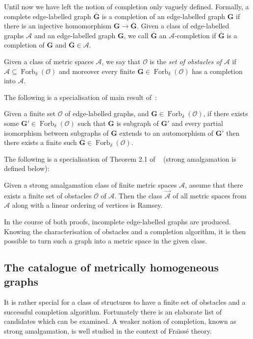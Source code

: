 \documentclass[11pt]{amsart}
\def\Forb{\mathop{\mathrm{Forb}}\nolimits}
\def\str#1{\mathbf {#1}}
\def\Fraisse{Fra\"{\i}ss\' e}
\begin{document}
Until now we have left the notion of completion only vaguely defined. Formally, a complete edge-labelled graph $\bar{\str{G}}$ is a completion of an edge-labelled graph $\str{G}$ if there is an injective homomorphism $\str{G}\to\bar {\str{G}}$. Given a class of edge-labelled graphs $\mathcal A$ and an edge-labelled graph $\str{G}$, we call $\bar {\str{G}}$ an $\mathcal A$-completion if $\bar {\str{G}}$ is a completion of $\str{G}$ and $\bar {\str{G}}\in\mathcal A$.

\begin{definition}
Given a class of metric spaces $\mathcal A$, we say that $\mathcal O$ is the {\em
set of obstacles of $\mathcal A$} if $\mathcal A\subseteq \Forb_{\delta}(\mathcal O)$ and
moreover every finite $\str{G}\in \Forb_{\delta}(\mathcal O)$ has a completion into $\mathcal A$.
\end{definition}

The following is a specialisation of main result of~\cite[Theorem~3.2]{herwig2000}:
\begin{theorem}
\label{thm:herwiglascar}
Given a finite set $\mathcal{O}$ of edge-la\-belled graphs, and $\str{G}\in \Forb_{\delta}(\mathcal O)$,
 if there exists some $\str{G}'\in \Forb_{\delta}(\mathcal O)$ such that $\str{G}$ is subgraph of $\str{G}'$ and every partial isomorphism between subgraphs of $\str{G}$
extends to an automorphism of $\str{G}'$ then there exists a finite such $\overline{\str{G}} \in \Forb_{\delta}(\mathcal O)$.
\end{theorem}
The following is a specialisation of Theorem 2.1 of ~\cite{Hubicka2016} (strong amalgamation is defined below):
\begin{theorem}
\label{thm:localfini}
Given a strong amalgamation class of finite metric spaces $\mathcal A$, assume that there exists a finite set of obstacles $\mathcal O$ of $\mathcal A$.
Then the class $\overrightarrow{\mathcal A}$ of all metric spaces from $\mathcal A$ along with a linear ordering of vertices is Ramsey.
\end{theorem}
 In the course of both proofs, incomplete edge-labelled graphs are produced.
Knowing the characterisation of obstacles and a completion algorithm, it is then
possible to turn such a graph into a metric space in the given class.

\subsection{The catalogue of metrically homogeneous graphs}\label{sec:homogen}
It is rather special for a class of structures to have a finite set of obstacles and a successful completion algorithm. Fortunately there
is an elaborate list of candidates which can be examined.
A weaker notion of completion, known as strong amalgamation, is well studied in the
context of \Fraisse{} theory. 
\end{document}
